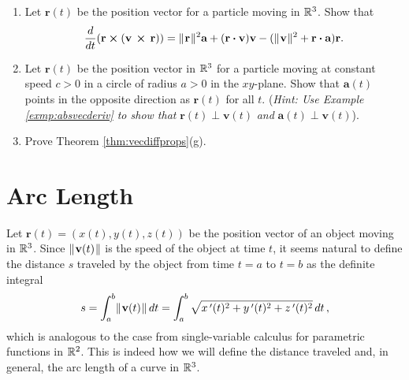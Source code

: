 \begin{enumerate}[\bfseries 1.]
\begin{alignat*}{3}
   \ssub{\textbf{b}}{1}^{\scriptscriptstyle 1}(t) &= ( 1 - t )\ssub{\textbf{b}}{1} + t \ssub{\textbf{b}}{2} \qquad
    & \ssub{\textbf{b}}{1}^{\scriptscriptstyle 2}(t) &=
    ( 1 - t )\ssub{\textbf{b}}{1}^{\scriptscriptstyle 1}(t) + t \ssub{\textbf{b}}{2}^{\scriptscriptstyle 1}(t)\\
   \ssub{\textbf{b}}{2}^{\scriptscriptstyle 1}(t) &= ( 1 - t )\ssub{\textbf{b}}{2} + t \ssub{\textbf{b}}{3}
  \end{alignat*}
  \begin{enumerate}[(a)]
   \item Show that $\ssub{\textbf{b}}{0}^{\scriptscriptstyle 3}(t) = (1 - t)^3 \ssub{\textbf{b}}{0} +
    3t(1 - t)^2 \ssub{\textbf{b}}{1} + 3t^2 (1 - t) \ssub{\textbf{b}}{2} + t^3 \ssub{\textbf{b}}{3}$.
   \item Write the explicit formula (as in Example \ref{exmp:bezier}) for the B\'{e}zier curve for the points
   $\ssub{\textbf{b}}{0} = (0,0,0)$, $\ssub{\textbf{b}}{1} = (0,1,1)$, $\ssub{\textbf{b}}{2} = (2,3,0)$,
   $\ssub{\textbf{b}}{3} = (4,5,2)$.
  \end{enumerate}
 \item Let $\textbf{r}(t)$ be the position vector for a particle moving in $\mathbb{R}^{3}$. Show that
  \[
   \dfrac{d}{dt} ( \textbf{r} \bm{\times} ( \textbf{v}\, \bm{\times} \,\textbf{r} ) ) =
    \lVert\mspace{1mu}\textbf{r}\mspace{1mu}\rVert^2 \textbf{a} + (\textbf{r} \bm{\cdot} \textbf{v}) \textbf{v} -
    (\lVert\mspace{1mu}\textbf{v}\mspace{1mu}\rVert^2 + \textbf{r} \bm{\cdot} \textbf{a})\textbf{r} .
  \]
 \item Let $\textbf{r}(t)$ be the position vector in $\mathbb{R}^{3}$ for a particle moving at constant speed $c > 0$
  in a circle of radius $a > 0$ in the $xy$-plane. Show that $\textbf{a}(t)$ points in the opposite direction as
  $\textbf{r}(t)$ for all $t$. (\emph{Hint: Use Example \ref{exmp:absvecderiv} to show that} $\textbf{r}(t)
  \perp \textbf{v}(t)$ \emph{and} $\textbf{a}(t) \perp \textbf{v}(t)$).
 \item Prove Theorem \ref{thm:vecdiffprops}(g).
\end{enumerate}
\newpage
\section{Arc Length}
Let $\textbf{r}(t) = (x(t),y(t),z(t))$ be the position vector of an object moving in $\mathbb{R}^{3}$. Since
$\lVert\mspace{1mu}\textbf{v}(t)\mspace{1mu}\rVert$ is the speed of the object at time $t$, it seems natural to define the distance $s$
traveled by the object from time $t = a$ to $t = b$ as the definite integral
\begin{equation}\label{eqn:arclenspeed}
 s = \int_{a}^{b} \lVert\mspace{1mu}\textbf{v}(t)\mspace{1mu}\rVert\,dt = \int_{a}^{b} \sqrt{x\,'(t)^2 + y\,'(t)^2 + z\,'(t)^2} \, dt \, ,
\end{equation}
which is analogous to the case from single-variable calculus for parametric functions in $\mathbb{R}^{2}$. This is indeed how
we will define the distance traveled and, in general, the arc length of a curve in $\mathbb{R}^{3}$.

